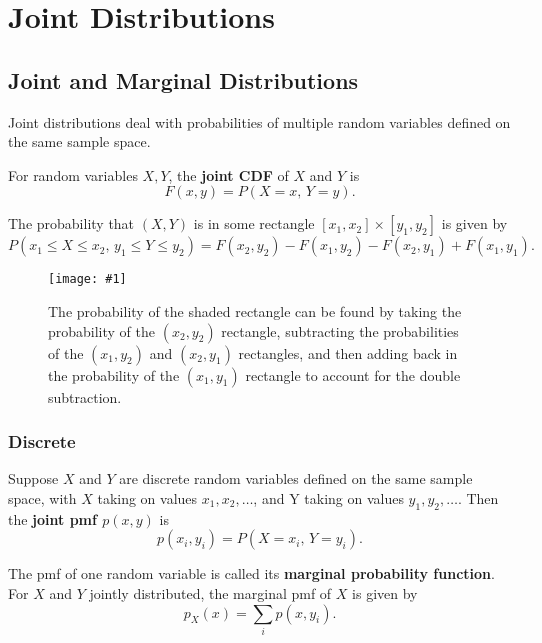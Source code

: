 \documentclass[a4paper,10pt]{article}
\newcommand{\fig}[1]{\centerline{\texttt{[image: \#1]}}}
\begin{document}
\newpage
\section{Joint Distributions}

\subsection{Joint and Marginal Distributions}

Joint distributions deal with probabilities of multiple random variables defined on the same sample space.

For random variables $X, Y$, the \textbf{joint CDF} of $X$ and $Y$ is \begin{equation*}
    F(x, y) = P(X=x,\,Y=y).
\end{equation*}

The probability that $(X, Y)$ is in some rectangle $[x_1, x_2] \times [y_1, y_2]$ is given by 
\begin{equation*}
    P(x_1\leq X\leq x_2,\,y_1\leq Y\leq y_2) = F(x_2, y_2) - F(x_1, y_2) - F(x_2, y_1) + F(x_1, y_1).
\end{equation*}

\begin{figure}[!ht]
    \centering
    \fig{joint}
    \caption{The probability of the shaded rectangle can be found by taking the probability of the $(x_2, y_2)$ rectangle, subtracting the probabilities of the $(x_1, y_2)$ and $(x_2, y_1)$ rectangles, and then adding back in the probability of the $(x_1, y_1)$ rectangle to account for the double subtraction.}
\end{figure}

\subsubsection{Discrete}

Suppose $X$ and $Y$ are discrete random variables defined on the same sample space, with $X$ taking on values $x_1, x_2, \ldots$, and Y taking on values $y_1, y_2, \ldots$. Then the \textbf{joint pmf $p(x, y)$} is 
\begin{equation*}
    p(x_i, y_i) = P(X=x_i,\,Y=y_i).
\end{equation*}

The pmf of one random variable is called its \textbf{marginal probability function}. For $X$ and $Y$ jointly distributed, the marginal pmf of $X$ is given by 
\begin{equation*}
    p_X(x) = \sum_i p(x, y_i).
\end{equation*}
\end{document}
